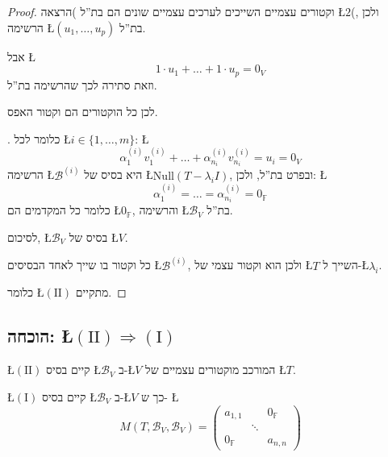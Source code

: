 \documentclass[english,hebrew]{article}
\begin{document}
\begin{proof}
וקטורים עצמיים השייכים לערכים עצמיים שונים הם בת\textquotedblright ל
)הרצאה \L{$2$}(, ולכן הרשימה \L{$(u_{1},\dots,u_{p})$} בת\textquotedblright ל.

אבל \L{%
\[
1\cdot u_{1}+\dots+1\cdot u_{p}=0_{V}
\]
}%
וזאת סתירה לכך שהרשימה בת\textquotedblright ל.

לכן כל הוקטורים הם וקטור האפס.

{\endL}. כלומר לכל \L{$i\in\{1,\dots,m\}$}: \L{%
\[
\alpha_{1}^{(i)}v_{1}^{(i)}+\dots+\alpha_{n_{i}}^{(i)}v_{n_{i}}^{(i)}=u_{i}=0_{V}
\]
}%
הרשימה \L{$\mathcal{B}^{(i)}$} היא בסיס של \L{$\text{Null}(T-\lambda_{i}I)$},
ובפרט בת\textquotedblright ל, ולכן: \L{%
\[
\alpha_{1}^{(i)}=\dots=\alpha_{n_{i}}^{(i)}=0_{\mathbb{F}}
\]
}%
כלומר כל המקדמים הם \L{$0_{\mathbb{F}}$}, והרשימה \L{$\mathcal{B}_{V}$}
בת\textquotedblright ל.

לסיכום, \L{$\mathcal{B}_{V}$} בסיס של \L{$V$}.

כל וקטור בו שייך לאחד הבסיסים \L{$\mathcal{B}^{(i)}$}, ולכן הוא וקטור
עצמי של \L{$T$} השייך ל-\L{$\lambda_{i}$}. 

כלומר \L{$(\text{II})$} מתקיים.
\end{proof}

\subsection{הוכחה: \L{$(\text{II})\Rightarrow(\text{I})$}}

\L{$(\text{II})$} קיים בסיס \L{$\mathcal{B}_{V}$} ב-\L{$V$} המורכב
מוקטורים עצמיים של \L{$T$}.

\L{$(\text{I})$} קיים בסיס \L{$\mathcal{B}_{V}$} ב-\L{$V$} כך ש-
\L{%
\[
M(T,\mathcal{B}_{V},\mathcal{B}_{V})=\begin{pmatrix}a_{1,1} &  & 0_{\mathbb{F}}\\
 & \ddots\\
0_{\mathbb{F}} &  & a_{n,n}
\end{pmatrix}
\]
}%
\end{document}
